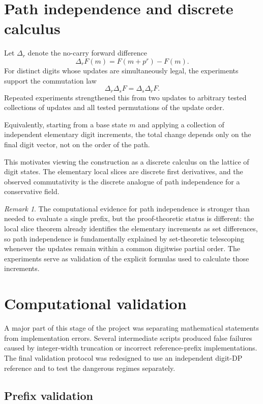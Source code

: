\documentclass[11pt,a4paper]{article}
\theoremstyle{definition}
\theoremstyle{remark}
\newtheorem{remark}[theorem]{Remark}
\begin{document}
\section{Path independence and discrete calculus}

Let $\Delta_r$ denote the no-carry forward difference
\[
 \Delta_rF(m)=F(m+p^r)-F(m).
\]
For distinct digits whose updates are simultaneously legal, the experiments support the commutation law
\[
 \Delta_r\Delta_sF
 =
 \Delta_s\Delta_rF.
\]
Repeated experiments strengthened this from two updates to arbitrary tested collections of updates and all tested permutations of the update order.

Equivalently, starting from a base state $m$ and applying a collection of independent elementary digit increments, the total change depends only on the final digit vector, not on the order of the path.

This motivates viewing the construction as a discrete calculus on the lattice of digit states.  The elementary local slices are discrete first derivatives, and the observed commutativity is the discrete analogue of path independence for a conservative field.

\begin{remark}
The computational evidence for path independence is stronger than needed to evaluate a single prefix, but the proof-theoretic status is different: the local slice theorem already identifies the elementary increments as set differences, so path independence is fundamentally explained by set-theoretic telescoping whenever the updates remain within a common digitwise partial order.  The experiments serve as validation of the explicit formulas used to calculate those increments.
\end{remark}

\section{Computational validation}

A major part of this stage of the project was separating mathematical statements from implementation errors.  Several intermediate scripts produced false failures caused by integer-width truncation or incorrect reference-prefix implementations.  The final validation protocol was redesigned to use an independent digit-DP reference and to test the dangerous regimes separately.

\subsection{Prefix validation}
\end{document}
